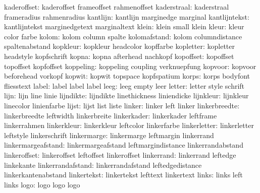         kaderoffset:  kaderoffset          frameoffset         rahmenoffset
        kaderstraal:  kaderstraal          frameradius         rahmenradius
           kantlijn:  kantlijn             marginedge          marginal
      kantlijntekst:  kantlijntekst        marginedgetext      marginaltext
              klein:  klein                small               klein
              kleur:  kleur                color               farbe
              kolom:  kolom                column              spalte
       kolomafstand:  kolom                columndistance      spaltenabstand
           kopkleur:  kopkleur             headcolor           kopffarbe
          kopletter:  kopletter            headstyle           kopfschrift
              kopna:  kopna                afterhead           nachkopf
          kopoffset:  kopoffset            topoffset           kopfoffset
          koppeling:  koppeling            coupling            verknuepfung
            kopvoor:  kopvoor              beforehead          vorkopf
             kopwit:  kopwit               topspace            kopfspatium
              korps:  korps                bodyfont            fliesstext
              label:  label                label               label
               leeg:  leeg                 empty               leer
             letter:  letter               style               schrift
               lijn:  lijn                 line                linie
          lijndikte:  lijndikte            linethickness       liniendicke
          lijnkleur:  lijnkleur            linecolor           linienfarbe
              lijst:  lijst                list                liste
             linker:  linker               left                linker
      linkerbreedte:  linkerbreedte        leftwidth           linkerbreite
        linkerkader:  linkerkader          leftframe           linkerrahmen
        linkerkleur:  linkerkleur          leftcolor           linkerfarbe
       linkerletter:  linkerletter         leftstyle           linkerschrift
        linkermarge:  linkermarge          leftmargin          linkerrand
 linkermargeafstand:  linkermargeafstand   leftmargindistance  linkerrandabstand
       linkeroffset:  linkeroffset         leftoffset          linkeroffset
         linkerrand:  linkerrand           leftedge            linkekante
  linkerrandafstand:  linkerrandafstand    leftedgedistance    linkerkantenabstand
        linkertekst:  linkertekst          lefttext            linkertext
              links:  links                left                links
               logo:  logo                 logo                logo

